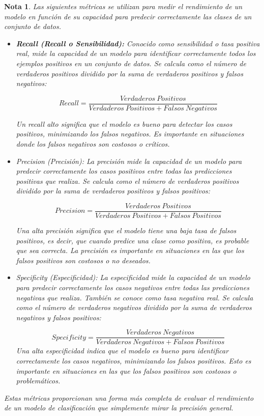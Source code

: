 \documentclass[12pt]{article}
\newtheorem{Note}{Nota}%
\begin{document}
\begin{Note}
Las siguientes métricas se utilizan para medir el rendimiento de un modelo en función de su capacidad para predecir correctamente las clases de un conjunto de datos. 

\begin{itemize}

\item \textbf{Recall (Recall o Sensibilidad):} Conocido como sensibilidad o tasa positiva real, mide la capacidad de un modelo para identificar correctamente todos los ejemplos positivos en un conjunto de datos. Se calcula como el número de verdaderos positivos dividido por la suma de verdaderos positivos y falsos negativos:

\begin{equation}
Recall = \frac{Verdaderos\ Positivos}{Verdaderos\ Positivos + Falsos\ Negativos}
\end{equation}

Un recall alto significa que el modelo es bueno para detectar los casos positivos, minimizando los falsos negativos. Es importante en situaciones donde los falsos negativos son costosos o críticos.


\item Precision (Precisión): La precisión mide la capacidad de un modelo para predecir correctamente los casos positivos entre todas las predicciones positivas que realiza. Se calcula como el número de verdaderos positivos dividido por la suma de verdaderos positivos y falsos positivos:

\begin{equation}
Precision = \frac{Verdaderos\ Positivos}{Verdaderos\ Positivos + Falsos\ Positivos}
\end{equation}

Una alta precisión significa que el modelo tiene una baja tasa de falsos positivos, es decir, que cuando predice una clase como positiva, es probable que sea correcta. La precisión es importante en situaciones en las que los falsos positivos son costosos o no deseados.

\item Specificity (Especificidad): La especificidad mide la capacidad de un modelo para predecir correctamente los casos negativos entre todas las predicciones negativas que realiza. También se conoce como tasa negativa real. Se calcula como el número de verdaderos negativos dividido por la suma de verdaderos negativos y falsos positivos:

\begin{equation}
Specificity=\frac{Verdaderos\ Negativos}{Verdaderos\ Negativos+Falsos\ Positivos}\end{equation}
Una alta especificidad indica que el modelo es bueno para identificar correctamente los casos negativos, minimizando los falsos positivos. Esto es importante en situaciones en las que los falsos positivos son costosos o problem\'aticos.
\end{itemize}
Estas métricas proporcionan una forma más completa de evaluar el rendimiento de un modelo de clasificación que simplemente mirar la precisión general. 
\end{Note}
\end{document}
